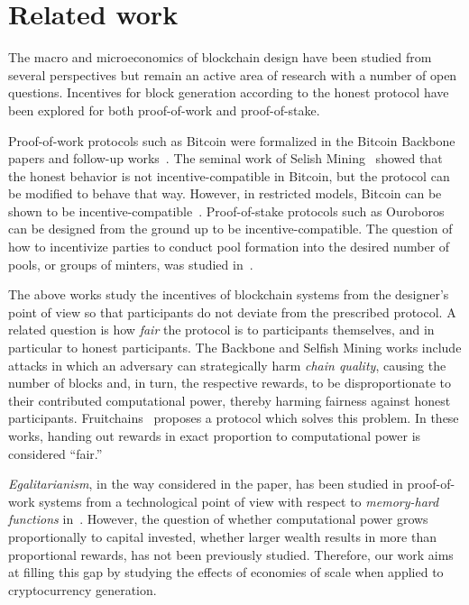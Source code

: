 \section{Related work}\label{sec:related}
The macro and microeconomics of blockchain design have been studied from
several perspectives but remain an active area of research with a number of open questions.
Incentives for block generation
according to the honest protocol have been explored for both proof-of-work and
proof-of-stake.

Proof-of-work protocols such as Bitcoin were formalized in the Bitcoin
Backbone~\cite{EC:GarKiaLeo15,C:GarKiaLeo17} papers and follow-up
works~\cite{pass2017analysis}. The seminal work of Selish
Mining~\cite{FC:EyaSir14,FC:SapSomZoh16} showed that the honest behavior is not
incentive-compatible in Bitcoin, but the protocol can be modified to behave
that way. However, in restricted models, Bitcoin can be shown to be incentive-compatible~\cite{kiayias2016blockchain}.  Proof-of-stake protocols such as
Ouroboros~\cite{C:KRDO17} can be designed from the ground up to be
incentive-compatible. The question of how to incentivize parties to conduct
pool formation into the desired number of pools, or groups of minters, was
studied in~\cite{bkks2018}.

The above works study the incentives of blockchain systems from the designer's
point of view so that participants do not deviate from the prescribed protocol.
A related question is how \emph{fair} the protocol is to participants
themselves, and in particular to honest participants. The Backbone and Selfish
Mining works include attacks in which an adversary can strategically harm
\emph{chain quality}, causing the number of blocks and, in turn, the respective
rewards, to be disproportionate to their contributed computational power, thereby
harming fairness against honest participants. Fruitchains~\cite{PODC:PasShi17}
proposes a protocol which solves this problem. In these works,
handing out rewards in exact proportion to computational power is considered
``fair.''

\emph{Egalitarianism}, in the way considered in the paper, has been studied in
proof-of-work systems from a technological point of view with respect to
\emph{memory-hard functions} in~\cite{alwen2017depth,biryukov2016egalitarian}.
However, the question
of whether computational power grows proportionally to capital invested, \ie
whether larger wealth results in more than proportional rewards, has not
been previously studied. Therefore, our work aims at filling this gap by
studying the effects of economies of scale when applied to cryptocurrency
generation.

